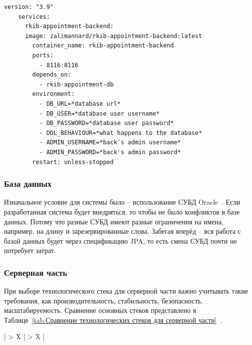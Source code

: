 \documentclass[a4paper,article]{article}
\begin{document}
\begin{sloppypar}
    \begin{lstlisting}[label=docker-composeyml,caption=Пример файла конфигурации docker-compose.yml]
    version: "3.9"
    services:
      rkib-appointment-backend:
      image: zalimannard/rkib-appointment-backend:latest
        container_name: rkib-appointment-backend
        ports:
          - 8116:8116
        depends_on:
          - rkib-appointment-db
        environment:
          - DB_URL=*database url*
          - DB_USER=*database user username*
          - DB_PASSWORD=*database user password*
          - DDL_BEHAVIOUR=*what happens to the database*
          - ADMIN_USERNAME=*back's admin username*
          - ADMIN_PASSWORD=*back's admin password*
        restart: unless-stopped
    \end{lstlisting}

    \subsubsection{База данных}\label{Реализация. Выбор. База данных}

    Изначальное условие для системы было -- использование СУБД Oracle~\cite{oracle}. Если разработанная система будет внедряться, то чтобы не было конфликтов в базе данных. Потому что разные СУБД имеют разные ограничения на имена, например, на длину и зарезервированные слова. Забегая вперёд -- вся работа с базой данных будет через спецификацию JPA, то есть смена СУБД почти не потребует затрат.

    \newpage

    \subsubsection{Серверная часть}\label{Реализация. Выбор. Серверная часть}

    При выборе технологического стека для серверной части важно учитывать такие требования, как производительность, стабильность, безопасность, масштабируемость. Сравнение основных стеков представлено в Таблице~\ref{tab:Сравнение технологических стеков для серверной части}~\cite{backstack}.

    \begin{xltabular}{\textwidth} { |
        >{\hsize} X |
        >{\hsize} X | }
        \caption{\centering Сравнение технологических стеков для серверной части}
        \label{tab:Сравнение технологических стеков для серверной части} \\


\end{xltabular}
\end{sloppypar}
\end{document}
